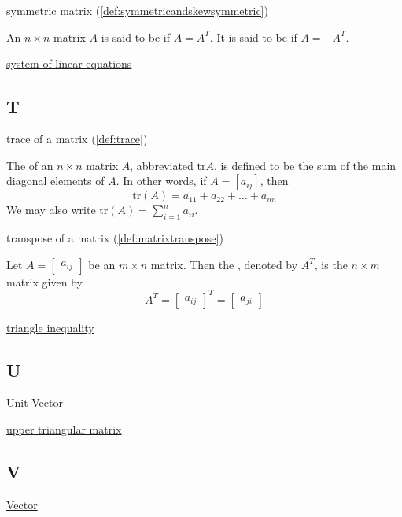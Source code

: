 \documentclass{ximera}
\begin{document}
symmetric matrix (\ref{def:symmetricandskewsymmetric})
\begin{expandable}
    An $n\times n$ matrix $A$ is said to be
 if $A=A^{T}.$ It is said to be
 if $A=-A^{T}.$
\end{expandable}

\href{https://ximera.osu.edu/oerlinalg/LinearAlgebra/SYS-0010/main}{system of linear equations}



\subsection{T}

trace of a matrix (\ref{def:trace})
\begin{expandable}
    The  of an $n \times n$ matrix $A$, abbreviated $\mbox{tr} A$, is defined to be the sum of the main diagonal elements of $A$.  In other words, if $ A = [a_{ij}]$, then $$\mbox{tr}(A) = a_{11} + a_{22} + \dots + a_{nn}$$  We may also write $\mbox{tr}(A) =\sum_{i=1}^n a_{ii}$.
\end{expandable}

transpose of a matrix (\ref{def:matrixtranspose})
\begin{expandable}
    Let $A=\begin{bmatrix} a _{ij}\end{bmatrix}$ be an $m\times n$ matrix. Then the , denoted by $A^{T}$, is the $n\times m$
matrix given by 
\begin{equation*}
A^{T} = \begin{bmatrix} a _{ij}\end{bmatrix}^{T}= \begin{bmatrix} a_{ji} \end{bmatrix}
\end{equation*}
\end{expandable}

\href{https://ximera.osu.edu/oerlinalg/LinearAlgebra/APX-0010/main}{triangle inequality}

\subsection{U}
\href{https://ximera.osu.edu/oerlinalg/LinearAlgebra/VEC-0036/main}{Unit Vector}

\href{https://ximera.osu.edu/oerlinalg/LinearAlgebra/MAT-0070/main}{upper triangular matrix}

\subsection{V}
\href{https://ximera.osu.edu/oerlinalg/LinearAlgebra/VEC-0010/main}{Vector}
\end{document}
